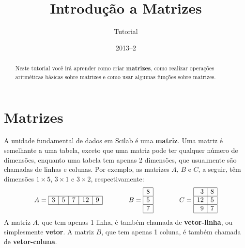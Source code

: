 \documentclass[11pt,fleqn]{practice}
\begin{document}
\subtitle{Tutorial}
\title{Introdução a Matrizes }
\date{2013--2}
\maketitle

\begin{abstract}
  Neste tutorial você irá aprender como criar \textbf{matrizes}, como realizar operações 
  aritméticas básicas sobre matrizes  e como usar algumas funções sobre matrizes. 

\end{abstract}

\tableofcontents

\section{Matrizes}

A unidade fundamental de dados em Scilab é uma \textbf{matriz}. Uma matriz é semelhante a uma tabela, exceto que uma matriz pode ter qualquer número de dimensões, enquanto uma tabela tem apenas 2 dimensões, que usualmente são chamadas de linhas e colunas.  Por exemplo, as matrizes $A$, $B$ e $C$, a seguir,  têm dimensões $1\times 5$, $3\times 1$ e $3\times 2$, respectivamente: 
\[ \begin{array}{lll}
A = \begin{array}{|r|r|r|r|r|} \hline 3 & 5 & 7 & 12 & 9 \\ \hline  \end{array} & \hspace*{1cm}
B = \begin{array}{|r|} \hline 8 \\ \hline 5 \\ \hline 7 \\ \hline \end{array}  & \hspace*{1cm}
C = \begin{array}{|r|r|} \hline 3 & 8 \\ \hline 12 & 5 \\ \hline 9 & 7 \\ \hline \end{array} 
\end{array}
\]
A matriz $A$, que tem apenas 1 linha, é também chamada de \textbf{vetor-linha}, ou simplesmente \textbf{vetor}.  A matriz $B$,  que tem apenas 1 coluna, é também chamada de \textbf{vetor-coluna}.  
\end{document}
